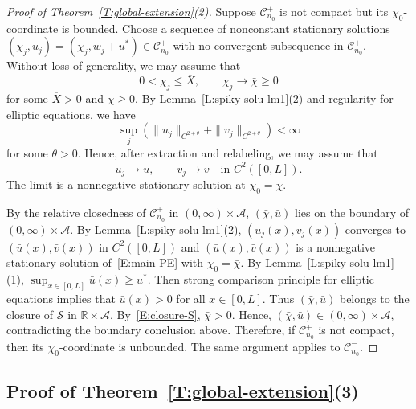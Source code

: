 \documentclass[11pt]{article} %
\theoremstyle{remark}
\theoremstyle{remark}
\numberwithin{equation}{section}
\numberwithin{figure}{section}
\numberwithin{table}{section}
\begin{document}
\begin{proof}[Proof of Theorem~\ref{T:global-extension}(2)]
  Suppose $\mathcal{C}_{n_0}^{+}$ is not compact but its $\chi_0$-coordinate is
  bounded. Choose a sequence of nonconstant stationary solutions $(\chi_j,u_j) =
  (\chi_j,w_j + u^*) \in \mathcal{C}_{n_0}^{+}$ with no convergent subsequence
  in $\mathcal{C}_{n_0}^+$. Without loss of generality, we may assume that
  \[
    0<\chi_j\le\overline{X},
    \qquad
    \chi_j\to\bar{\chi}\ge0
  \]
  for some $\overline{X} > 0$ and $\bar{\chi} \ge 0$. By
  Lemma~\ref{L:spiky-solu-lm1}(2) and regularity for elliptic equations, we have
  \[
    \sup_j\left(
    \|u_j\|_{C^{2+\theta}}
    +\|v_j\|_{C^{2+\theta}}
    \right)<\infty
  \]
  for some $\theta > 0$. Hence, after extraction and relabeling, we may assume
  that
  \[
    u_j\to\bar{u},\qquad v_j\to\bar{v}
    \quad\text{in }C^2([0,L]).
  \]
  The limit is a nonnegative stationary solution at $\chi_0 = \bar{\chi}$.


  By the relative closedness of $\mathcal{C}_{n_0}^+$ in $(0,
  \infty)\times\mathcal{A}$, $(\bar{\chi},\bar{u})$ lies on the boundary of $(0,
  \infty)\times\mathcal{A}$. By Lemma~\ref{L:spiky-solu-lm1}(2),
  $(u_j(x),v_j(x))$ converges to $(\bar{u}(x),\bar{v}(x))$ in $C^2([0, L])$ and
  $(\bar{u}(x),\bar{v}(x))$ is a nonnegative stationary solution
  of~\eqref{E:main-PE} with $\chi_0 = \bar{\chi}$. By
  Lemma~\ref{L:spiky-solu-lm1}(1), $\sup_{x\in [0,L]}\bar{u}(x) \ge u^*$. Then
  strong comparison principle for elliptic equations implies that $\bar{u}(x) >
  0$ for all $x \in [0, L]$.  Thus $(\bar{\chi},\bar{u})$ belongs to the closure of
  $\mathcal{S}$ in $\mathbb{R}\times\mathcal{A}$. By~\eqref{E:closure-S},
  $\bar{\chi} > 0$. Hence, $(\bar{\chi},\bar{u}) \in (0, \infty)\times\mathcal{A}$,
  contradicting the boundary conclusion above. Therefore, if
  $\mathcal{C}_{n_0}^+$ is not compact, then its $\chi_0$-coordinate is
  unbounded. The same argument applies to $\mathcal{C}_{n_0}^-$.
\end{proof}


\subsection{Proof of Theorem~\ref{T:global-extension}(3)}
\end{document}

